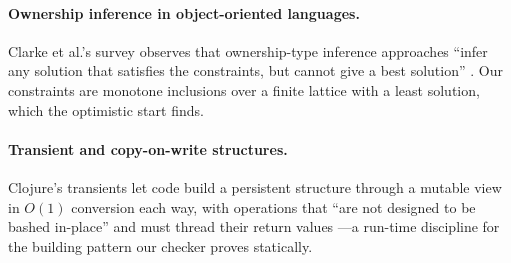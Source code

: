 \paragraph{Ownership inference in object-oriented languages.} Clarke et al.'s survey observes that
ownership-type inference approaches ``infer any solution that satisfies the constraints, but cannot give a
best solution'' \citep[\S5]{clarke2013survey}. Our constraints are monotone inclusions over a finite lattice
with a least solution, which the optimistic start finds.

\paragraph{Transient and copy-on-write structures.} Clojure's transients let code build a persistent
structure through a mutable view in $O(1)$ conversion each way, with operations that ``are not designed to be
bashed in-place'' and must thread their return values \citep{hickey2009transients}---a run-time discipline for
the building pattern our checker proves statically.
